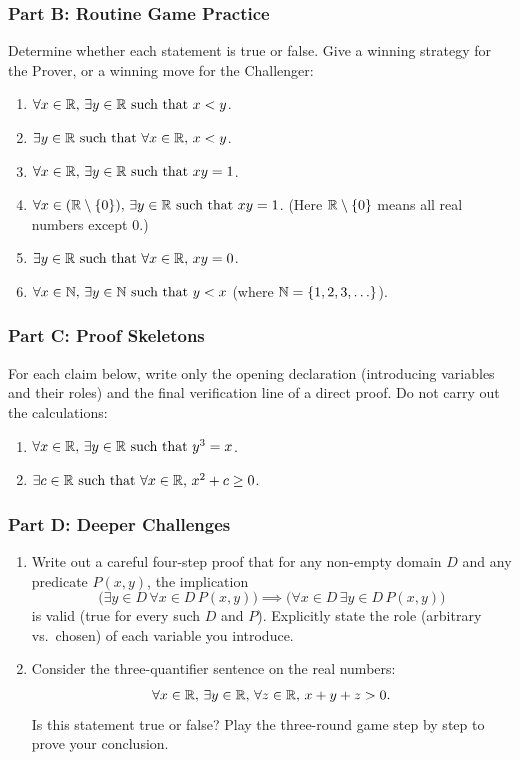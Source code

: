 \subsubsection*{Part B: Routine Game Practice}
Determine whether each statement is true or false. Give a winning strategy for the Prover, or a winning move for the Challenger:
\begin{enumerate}[resume]
\item $\forall x \in \mathbb{R}, \, \exists y \in \mathbb{R} \text{ such that } x < y$.
\item $\exists y \in \mathbb{R} \text{ such that } \forall x \in \mathbb{R}, \, x < y$.
\item $\forall x \in \mathbb{R}, \, \exists y \in \mathbb{R} \text{ such that } xy = 1$.
\item $\forall x \in (\mathbb{R} \setminus \{0\}), \, \exists y \in \mathbb{R} \text{ such that } xy = 1$. (Here $\mathbb{R} \setminus \{0\}$ means all real numbers except $0$.)
\item $\exists y \in \mathbb{R} \text{ such that } \forall x \in \mathbb{R}, \, xy = 0$.
\item $\forall x \in \mathbb{N}, \, \exists y \in \mathbb{N} \text{ such that } y < x$ (where $\mathbb{N} = \{1, 2, 3, \ldots\}$).
\end{enumerate}

\subsubsection*{Part C: Proof Skeletons}
For each claim below, write only the opening declaration (introducing variables and their roles) and the final verification line of a direct proof. Do not carry out the calculations:
\begin{enumerate}[resume]
\item $\forall x \in \mathbb{R}, \, \exists y \in \mathbb{R} \text{ such that } y^3 = x$.
\item $\exists c \in \mathbb{R} \text{ such that } \forall x \in \mathbb{R}, \, x^2 + c \ge 0$.
\end{enumerate}

\subsubsection*{Part D: Deeper Challenges}
\begin{enumerate}[resume]
\item Write out a careful four-step proof that for any non-empty domain $D$ and any predicate $P(x, y)$, the implication
\[
\bigl(\exists y \in D \, \forall x \in D \, P(x, y)\bigr) \implies \bigl(\forall x \in D \, \exists y \in D \, P(x, y)\bigr)
\]
is valid (true for every such $D$ and $P$). Explicitly state the role (arbitrary vs.\ chosen) of each variable you introduce.
\item Consider the three-quantifier sentence on the real numbers:
\[
\forall x \in \mathbb{R}, \, \exists y \in \mathbb{R}, \, \forall z \in \mathbb{R}, \, x + y + z > 0.
\]
Is this statement true or false? Play the three-round game step by step to prove your conclusion.
\end{enumerate}

